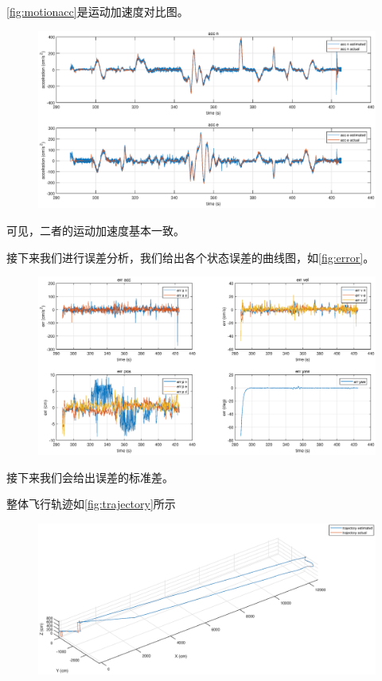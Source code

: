 \documentclass[
  type=master
]{gdutthesis}
\begin{document}
\autoref{fig:motionacc}是运动加速度对比图。
\begin{figure}[htbp]
	\centering
	\includegraphics[width=1.0\textwidth]{motionacc.eps}
	\label{fig:motionacc}
\end{figure}
可见，二者的运动加速度基本一致。

接下来我们进行误差分析，我们给出各个状态误差的曲线图，如\autoref{fig:error}。
\begin{figure}[htbp]
	\centering
	\includegraphics[width=1.0\textwidth]{error.eps}
	\label{fig:error}
\end{figure}
接下来我们会给出误差的标准差。

整体飞行轨迹如\autoref{fig:trajectory}所示
\begin{figure}[htbp]
	\centering
	\includegraphics[width=1.0\textwidth]{trajectory.eps}
	\label{fig:trajectory}
\end{figure}
\end{document}
